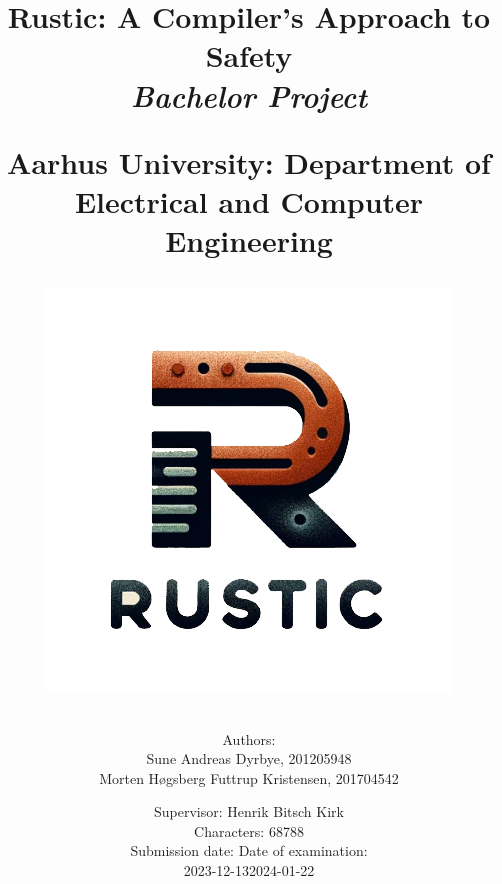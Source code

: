 \newcommand{\authorName}{}
\newcommand{\titleName}{Rustic: A Compiler's Approach to Safety}
\newcommand{\subject}{Bachelor Project}
\newcommand{\vejleder}{Supervisor: Henrik Bitsch Kirk}
\newcommand{\institute}{Aarhus University: Department of Electrical and Computer Engineering}
\begin{titlepage}
  \centering
    \title
    {
      \Huge \textbf{\titleName}\\
      \scale{\numberSQRTTWO}{\vspace{\sol pt}}
      \LARGE \textit{\subject}
      \scale{\numberSQRTTWO}{\rule{\linewidth}{\sol pt}}

      \textbf{\institute}

      \begin{figure}[h]
        \centering
        \includegraphics[scale=0.65]{02-Body/Images/RusticLogo.png}
      \end{figure}

      \author
    {
      \LARGE Authors: \\
      Sune Andreas Dyrbye, 201205948 \\
      Morten Høgsberg Futtrup Kristensen, 201704542 \\
      }
           \date{
        \Large \vejleder \\
        Characters: 68788\\
        \vspace{1em}
        Submission date: \hfill
        Date of examination:\\
        2023-12-13\hfill 2024-01-22
      }


    }
   
\end{titlepage}
